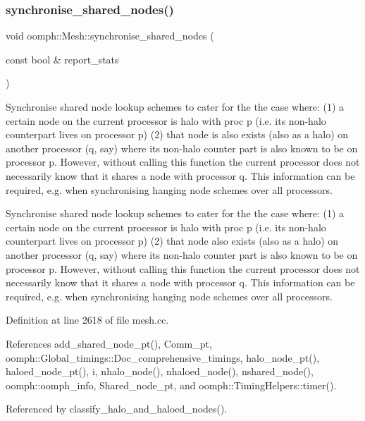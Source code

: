 \subsubsection{\texorpdfstring{synchronise\+\_\+shared\+\_\+nodes()}{synchronise\_shared\_nodes()}}
{\footnotesize\ttfamily void oomph\+::\+Mesh\+::synchronise\+\_\+shared\+\_\+nodes (\begin{DoxyParamCaption}\item[{const bool \&}]{report\+\_\+stats }\end{DoxyParamCaption})}



Synchronise shared node lookup schemes to cater for the the case where\+: (1) a certain node on the current processor is halo with proc p (i.\+e. its non-\/halo counterpart lives on processor p) (2) that node is also exists (also as a halo) on another processor (q, say) where its non-\/halo counter part is also known to be on processor p. However, without calling this function the current processor does not necessarily know that it shares a node with processor q. This information can be required, e.\+g. when synchronising hanging node schemes over all processors. 

Synchronise shared node lookup schemes to cater for the the case where\+: (1) a certain node on the current processor is halo with proc p (i.\+e. its non-\/halo counterpart lives on processor p) (2) that node also exists (also as a halo) on another processor (q, say) where its non-\/halo counter part is also known to be on processor p. However, without calling this function the current processor does not necessarily know that it shares a node with processor q. This information can be required, e.\+g. when synchronising hanging node schemes over all processors. 

Definition at line 2618 of file mesh.\+cc.



References add\+\_\+shared\+\_\+node\+\_\+pt(), Comm\+\_\+pt, oomph\+::\+Global\+\_\+timings\+::\+Doc\+\_\+comprehensive\+\_\+timings, halo\+\_\+node\+\_\+pt(), haloed\+\_\+node\+\_\+pt(), i, nhalo\+\_\+node(), nhaloed\+\_\+node(), nshared\+\_\+node(), oomph\+::oomph\+\_\+info, Shared\+\_\+node\+\_\+pt, and oomph\+::\+Timing\+Helpers\+::timer().



Referenced by classify\+\_\+halo\+\_\+and\+\_\+haloed\+\_\+nodes().

\mbox{\label{classoomph_1_1Mesh_afa4aa3d2d41bd2a5a40ce4cffc9e2952}} 
